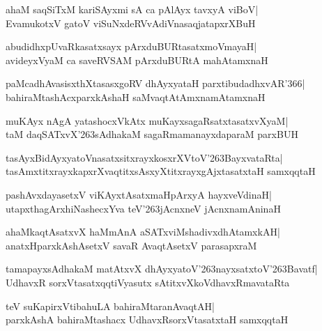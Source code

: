 \documentclass[twoside,12pt,openright]{book}
\def\S{\char'263}
\newcounter{shloka}[chapter]
\begin{document}
\begin{shloka}%
ahaM saqSiTxM kariSAyxmi sA ca pAlAyx tavxyA viBoV|\\
EvamukotxV gatoV viSuNxdeRVvAdiVnasaqjatapxrXBuH
\end{shloka}

\begin{shloka}%
abudidhxpUvaRkasatxsayx pArxduBURtasatxmoVmayaH|\\
avideyxVyaM ca saveRVSAM pArxduBURtA mahAtamxnaH
\end{shloka}

\begin{shloka}%
paMcadhAvasisxthXtasasxgoRV dhAyxyataH parxtibudadhxvAR\char'366|\\
bahiraMtashAcxparxkAshaH saMvaqtAtAmxnamAtamxnaH
\end{shloka}

\begin{shloka}%
muKAyx nAgA yatashocxVkAtx muKayxsagaRsatxtasatxvXyaM|\\
taM daqSATxvX\S sAdhakaM sagaRmamanayxdaparaM parxBUH
\end{shloka}

\begin{shloka}%
tasAyxBidAyxyatoVnasatxsitxrayxkosxrXVtoV\S BayxvataRta|\\
tasAmxtitxrayxkapxrXvaqtitxsAsxyXtitxrayxgAjxtasatxtaH samxqqtaH
\end{shloka}

\begin{shloka}%
pashAvxdayasetxV viKAyxtAsatxmaHpArxyA hayxveVdinaH|\\
utapxthagArxhiNashecxYva teV\S jAcnxneV jAcnxnamAninaH
\end{shloka}

\begin{shloka}%
ahaMkaqtAsatxvX haMmAnA aSATxviMshadivxdhAtamxkAH|\\
anatxHparxkAshAsetxV savaR AvaqtAsetxV parasapxraM
\end{shloka}

\begin{shloka}%
tamapayxsAdhakaM matAtxvX dhAyxyatoV\S nayxsatxtoV\S Bavatf|\\
UdhavxR sorxVtasatxqqtiVyasutx sAtitxvXkoVdhavxRmavataRta
\end{shloka}

\begin{shloka}%
teV suKapirxVtibahuLA bahiraMtaranAvaqtAH|\\
parxkAshA bahiraMtashacx UdhavxRsorxVtasatxtaH samxqqtaH
\end{shloka}
\end{document}
